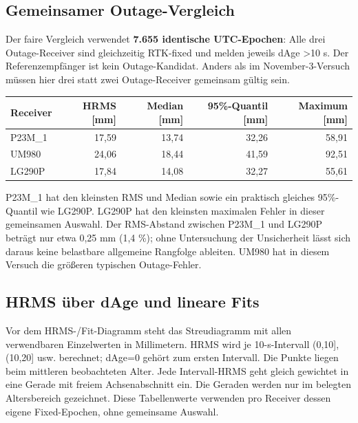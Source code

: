 \documentclass[11pt,a4paper]{article}
\numberwithin{equation}{section}
\numberwithin{figure}{section}
\begin{document}
\subsection{Gemeinsamer Outage-Vergleich}

Der faire Vergleich verwendet \textbf{7.655 identische UTC-Epochen}: Alle drei Outage-Receiver sind gleichzeitig RTK-fixed und melden jeweils dAge >10 s. Der Referenzempfänger ist kein Outage-Kandidat. Anders als im November-3-Versuch müssen hier drei statt zwei Outage-Receiver gemeinsam gültig sein.

\begin{center}\begin{lrbox}{\reporttable}\small\setlength{\tabcolsep}{4pt}\begin{tabular}{lrrrr}\toprule
Receiver & HRMS [mm] & Median [mm] & 95\%-Quantil [mm] & Maximum [mm]\\\midrule
P23M\_1 & 17,59 & 13,74 & 32,26 & 58,91\\
UM980 & 24,06 & 18,44 & 41,59 & 92,51\\
LG290P & 17,84 & 14,08 & 32,27 & 55,61\\
\bottomrule\end{tabular}\end{lrbox}\ifdim\wd\reporttable>\linewidth\resizebox{\linewidth}{!}{\usebox{\reporttable}}\else\usebox{\reporttable}\fi\end{center}

P23M\_1 hat den kleinsten RMS und Median sowie ein praktisch gleiches 95\%-Quantil wie LG290P. LG290P hat den kleinsten maximalen Fehler in dieser gemeinsamen Auswahl. Der RMS-Abstand zwischen P23M\_1 und LG290P beträgt nur etwa 0,25 mm (1,4 \%); ohne Untersuchung der Unsicherheit lässt sich daraus keine belastbare allgemeine Rangfolge ableiten. UM980 hat in diesem Versuch die größeren typischen Outage-Fehler.

\subsection{HRMS über dAge und lineare Fits}

Vor dem HRMS-/\allowbreak{}Fit-Diagramm steht das Streudiagramm mit allen verwendbaren Einzelwerten in Millimetern. HRMS wird je 10-s-Intervall (0,10], (10,20] usw. berechnet; dAge=0 gehört zum ersten Intervall. Die Punkte liegen beim mittleren beobachteten Alter. Jede Intervall-HRMS geht gleich gewichtet in eine Gerade mit freiem Achsenabschnitt ein. Die Geraden werden nur im belegten Altersbereich gezeichnet. Diese Tabellenwerte verwenden pro Receiver dessen eigene Fixed-Epochen, ohne gemeinsame Auswahl.
\end{document}
